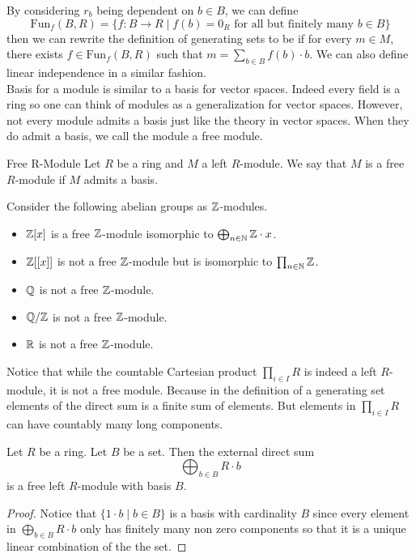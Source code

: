 \documentclass[a4paper]{article}
\begin{document}
By considering $r_b$ being dependent on $b\in B$, we can define $$\text{Fun}_f(B,R)=\{f:B\to R\;|\;f(b)=0_R\text{ for all but finitely many }b\in B\}$$ then we can rewrite the definition of generating sets to be if for every $m\in M$, there exists $f\in\text{Fun}_f(B,R)$ such that $m=\sum_{b\in B}f(b)\cdot b$. We can also define linear independence in a similar fashion. \\

Basis for a module is similar to a basis for vector spaces. Indeed every field is a ring so one can think of modules as a generalization for vector spaces. However, not every module admits a basis just like the theory in vector spaces. When they do admit a basis, we call the module a free module. 

\begin{defn}{Free R-Module}{} Let $R$ be a ring and $M$ a left $R$-module. We say that $M$ is a free $R$-module if $M$ admits a basis. 
\end{defn}

\begin{eg}{}{} Consider the following abelian groups as $\mathbb{Z}$-modules. 
\begin{itemize}
\item $\mathbb{Z}[x]$ is a free $\mathbb{Z}$-module isomorphic to $\bigoplus_{n\in\mathbb{N}}\mathbb{Z}\cdot x$. 
\item $\mathbb{Z}[[x]]$ is not a free $\mathbb{Z}$-module but is isomorphic to $\prod_{n\in\mathbb{N}}\mathbb{Z}$. 
\item $\mathbb{Q}$ is not a free $\mathbb{Z}$-module. 
\item $\mathbb{Q}/\mathbb{Z}$ is not a free $\mathbb{Z}$-module. 
\item $\mathbb{R}$ is not a free $\mathbb{Z}$-module. 
\end{itemize}
\end{eg}

Notice that while the countable Cartesian product $\prod_{i\in I}R$ is indeed a left $R$-module, it is not a free module. Because in the definition of a generating set elements of the direct sum is a finite sum of elements. But elements in $\prod_{i\in I}R$ can have countably many long components. 

\begin{lmm}{}{} Let $R$ be a ring. Let $B$ be a set. Then the external direct sum $$\bigoplus_{b\in B}R\cdot b$$ is a free left $R$-module with basis $B$. 
\begin{proof}
Notice that $\{1\cdot b\;|\;b\in B\}$ is a basis with cardinality $B$ since every element in $\bigoplus_{b\in B}R\cdot b$ only has finitely many non zero components so that it is a unique linear combination of the the set. 
\end{proof}
\end{lmm}
\end{document}
